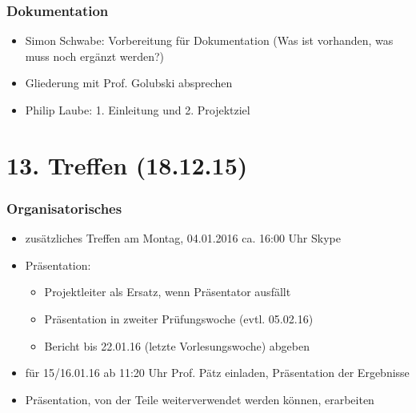 \subsubsection{Dokumentation}

\begin{itemize}
	\item Simon Schwabe: Vorbereitung für Dokumentation (Was ist vorhanden, was muss noch ergänzt werden?)
	\item Gliederung mit Prof. Golubski absprechen
	\item Philip Laube: 1. Einleitung und 2. Projektziel
\end{itemize}


\section{13. Treffen (18.12.15)}
\subsubsection{Organisatorisches}
\begin{itemize}
	\item zusätzliches Treffen am Montag, 04.01.2016 ca. 16:00 Uhr Skype
	\item Präsentation:
	\begin{itemize}
		\item Projektleiter als Ersatz, wenn Präsentator ausfällt
		\item Präsentation in zweiter Prüfungswoche (evtl. 05.02.16)
		\item Bericht bis 22.01.16 (letzte Vorlesungswoche) abgeben
	\end{itemize}
	\item für 15/16.01.16 ab 11:20 Uhr Prof. Pätz einladen, Präsentation der Ergebnisse
	\item Präsentation, von der Teile weiterverwendet werden können, erarbeiten
\end{itemize}
